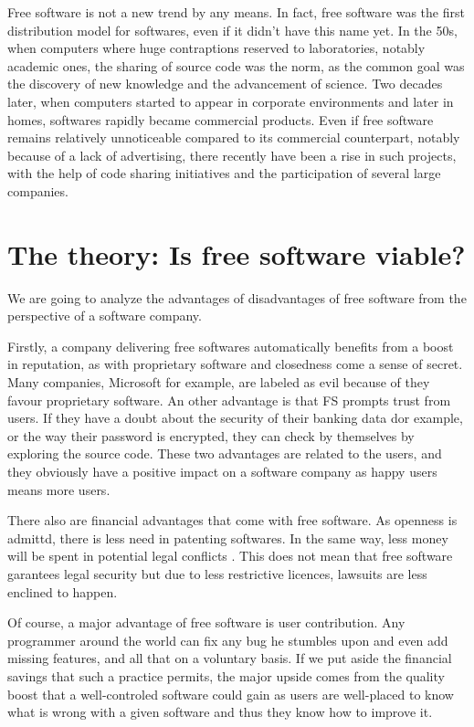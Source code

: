 \documentclass[12pt]{article}
\begin{document}
Free software is not a new trend by any means. In fact, free software
was the first distribution model for softwares, even if it didn't have
this name yet. In the 50s, when computers where huge contraptions
reserved to laboratories, notably academic ones, the sharing of source
code was the norm, as the common goal was the discovery of new
knowledge and the advancement of science. Two decades later, when
computers started to appear in corporate environments and later in
homes, softwares rapidly became commercial products. Even if free
software remains relatively unnoticeable compared to its commercial
counterpart, notably because of a lack of advertising, there recently
have been a rise in such projects, with the help of code sharing
initiatives and the participation of several large companies.

\section{The theory: Is free software viable?}

We are going to analyze the advantages of disadvantages of free
software from the perspective of a software company.

Firstly, a company delivering free softwares automatically benefits
from a boost in reputation, as with proprietary software and
closedness come a sense of secret. Many companies, Microsoft for
example, are labeled as evil because of they favour proprietary
software. An other advantage is that FS prompts trust from users. If
they have a doubt about the security of their banking data dor
example, or the way their password is encrypted, they can check by
themselves by exploring the source code. These two advantages are
related to the users, and they obviously have a positive impact on a
software company as happy users means more users.

There also are financial advantages that come with free software. As
openness is admittd, there is less need in patenting softwares.  In
the same way, less money will be spent in potential legal conflicts
\cite{afses}. This does not mean that free software garantees legal
security but due to less restrictive licences, lawsuits are less
enclined to happen.

Of course, a major advantage of free software is user
contribution. Any programmer around the world can fix any bug he
stumbles upon and even add missing features, and all that on a
voluntary basis. If we put aside the financial savings that such a
practice permits, the major upside comes from the quality boost that a
well-controled software could gain as users are well-placed to know
what is wrong with a given software and thus they know how to improve
it.
\end{document}
